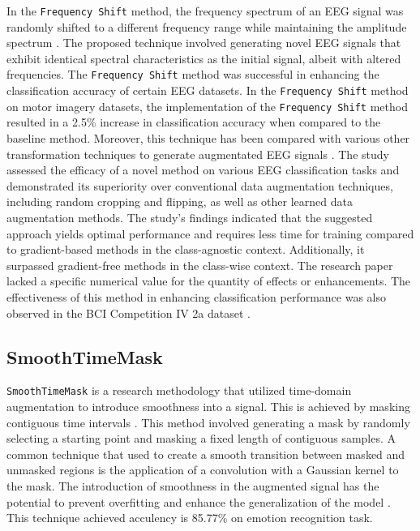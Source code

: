 \documentclass[12pt]{iopart}
\begin{document}
In the \texttt{Frequency Shift} method, the frequency spectrum of an EEG signal was randomly shifted to a different frequency range while maintaining the amplitude spectrum \cite{rommel2022data}. The proposed technique involved generating novel EEG signals that exhibit identical spectral characteristics as the initial signal, albeit with altered frequencies. The \texttt{Frequency Shift} method was successful in enhancing the classification accuracy of certain EEG datasets. In the \texttt{Frequency Shift} method on motor imagery datasets, the implementation of the \texttt{Frequency Shift} method resulted in a 2.5\% increase in classification accuracy when compared to the baseline method. Moreover, this technique has been compared with various other transformation techniques to generate augmentated EEG signals \cite{rommel2021cadda}. The study assessed the efficacy of a novel method on various EEG classification tasks and demonstrated its superiority over conventional data augmentation techniques, including random cropping and flipping, as well as other learned data augmentation methods. The study's findings indicated that the suggested approach yields optimal performance and requires less time for training compared to gradient-based methods in the class-agnostic context. Additionally, it surpassed gradient-free methods in the class-wise context. The research paper lacked a specific numerical value for the quantity of effects or enhancements. The effectiveness of this method in enhancing classification performance was also observed in the BCI Competition IV 2a dataset \cite{brunner2008bci}.
 
\subsection{SmoothTimeMask}
\texttt{SmoothTimeMask} is a research methodology that utilized time-domain augmentation to introduce smoothness into a signal. This is achieved by masking contiguous time intervals \cite{mohsenvand2020contrastive}.  This method involved generating a mask by randomly selecting a starting point and masking a fixed length of contiguous samples. A common technique that used to create a smooth transition between masked and unmasked regions is the application of a convolution with a Gaussian kernel to the mask. The introduction of smoothness in the augmented signal has the potential to prevent overfitting and enhance the generalization of the model \cite{mohsenvand2020contrastive}. This technique achieved acculency is 85.77\% on emotion recognition task. 
\end{document}
